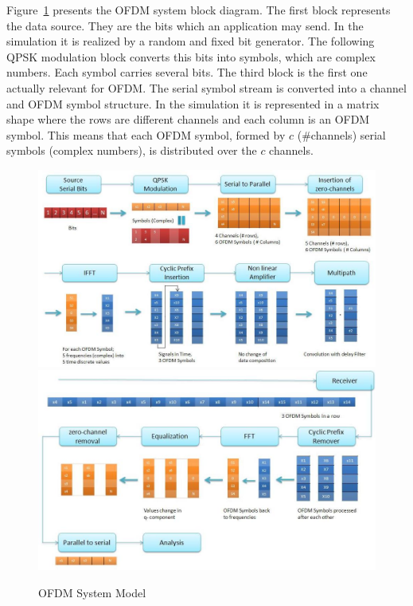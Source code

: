 Figure~\ref{fig:ofdmsystemmodel} presents the OFDM system block diagram. The first block represents the data source. They are the bits which an application may send. In the simulation it is realized by a random and fixed bit generator. The following QPSK modulation block converts this bits into symbols, which are complex numbers. Each symbol carries several bits. The third block is the first one actually relevant for OFDM. The serial symbol stream is converted into a channel and OFDM symbol structure. In the simulation it is represented in a matrix shape where the rows are different channels and each column is an OFDM symbol. This means that each OFDM symbol, formed by $c$ (\#channels) serial symbols (complex numbers), is distributed over the $c$ channels.\\

\begin{figure}[tbp]
\centering
\includegraphics[width=\textwidth]{content/fig/ofdmmodel1.JPG}
\includegraphics[width=\textwidth]{content/fig/ofdmmodel2.JPG}
\caption{OFDM System Model}
\label{fig:ofdmsystemmodel}
\end{figure}

